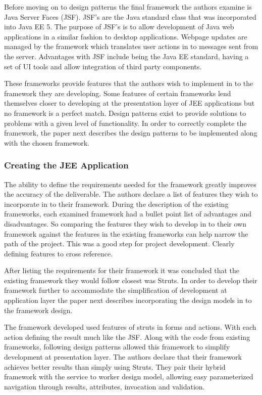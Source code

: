 \documentclass{article}
\begin{document}
		Before moving on to design patterns the final framework the authors examine is Java Server Faces (JSF). JSF’s are the Java standard class that was incorporated into Java EE 5. The purpose of JSF’s is to allow development of Java web applications in a similar fashion to desktop applications. Webpage updates are managed by the framework which translates user actions in to messages sent from the server. Advantages with JSF include being the Java EE standard, having a set of UI tools and allow integration of third party components.
		
		These frameworks provide features that the authors wish to implement in to the framework they are developing. Some features of certain frameworks lend themselves closer to developing at the presentation layer of JEE applications but no framework is a perfect match. Design patterns exist to provide solutions to problems with a given level of functionality\cite{designpatternshall}. In order to correctly complete the framework, the paper next describes the design patterns to be implemented along with the chosen framework. 
	
		\subsubsection{Creating the JEE Application}
		The ability to define the requirements needed for the framework greatly improves the accuracy of the deliverable. The authors declare a list of features they wish to incorporate in to their framework. During the description of the existing frameworks, each examined framework had a bullet point list of advantages and disadvantages. So comparing the features they wish to develop in to their own framework against the features in the existing frameworks can help narrow the path of the project. This was a good step for project development. Clearly defining features to cross reference.
		
		After listing the requirements for their framework it was concluded that the existing framework they would follow closest was Struts. In order to develop their framework further to accommodate the simplification of development at application layer the paper next describes incorporating the design models in to the framework design.
		
		The framework developed used features of struts in forms and actions. With each action defining the result much like the JSF. Along with the code from existing frameworks, following design patterns allowed this framework to simplify development at presentation layer. The authors declare that their framework achieves better results than simply using Struts. They pair their hybrid framework with the service to worker design model, allowing easy parameterized navigation through results, attributes, invocation and validation.
	
\end{document}
